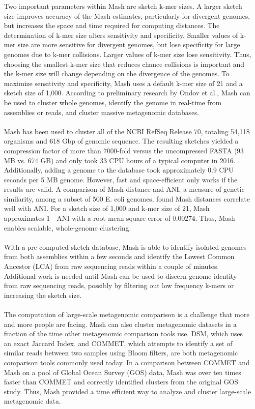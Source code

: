 \documentclass[12pt, letterpaper]{article}
\begin{document}
Two important parameters within Mash are sketch k-mer sizes. A larger sketch size improves accuracy of the Mash estimates, particularly for divergent genomes, but increases the space and time required for computing distances. The determination of k-mer size alters sensitivity and specificity. Smaller values of k-mer size are more sensitive for divergent genomes, but lose specificity for large genomes due to k-mer collisions. Larger values of k-mer size lose sensitivity. Thus, choosing the smallest k-mer size that reduces chance collisions is important and the k-mer size will change depending on the divergence of the genomes. To maximize sensitivity and specificity, Mash uses a default k-mer size of 21 and a sketch size of 1,000. According to preliminary research by Ondov et al., Mash can be used to cluster whole genomes, identify the genome in real-time  from assemblies or reads, and cluster massive metagenomic databases. \\ \\
Mash has been used to cluster all of the NCBI RefSeq Release 70, totaling 54,118 organisms and 618 Gbp of genomic sequence. The resulting sketches yielded a compression factor of more than 7000-fold versus the uncompressed FASTA (93 MB vs. 674 GB) and only took 33 CPU hours of a typical computer in 2016. Additionally, adding a genome to the database took approximately 0.9 CPU seconds per 5 MB genome. However, fast and space-efficient only works if the results are valid. A comparison of Mash distance and ANI, a  measure of genetic similarity, among a subset of 500 E. coli genomes, found Mash distances correlate well with ANI. For a sketch size of 1,000 and k-mer size of 21, Mash approximates 1 - ANI with a root-mean-square error of 0.00274. Thus, Mash enables scalable, whole-genome clustering. \\ \\
With a pre-computed sketch database, Mash is able to identify isolated genomes from both assemblies within a few seconds and identify the Lowest Common Ancestor (LCA) from raw sequencing reads within a couple of minutes. Additional work is needed until Mash can be used to discern genome identity from raw sequencing reads, possibly by filtering out low frequency k-mers or increasing the sketch size. \\ \\
The computation of large-scale metagenomic comparison is a challenge that more and more people are facing. Mash can also cluster metagenomic datasets in a fraction of the time other metagenomic comparison tools use. DSM, which uses an exact Jaccard Index, and COMMET, which attempts to identify a set of similar reads between two samples using Bloom filters, are both metagenomic comparison tools commonly used today. In a comparison between COMMET and Mash on a pool of Global Ocean Survey (GOS) data, Mash was over ten times faster than COMMET and correctly identified clusters from the original GOS study. Thus, Mash provided a time efficient way to analyze and cluster large-scale metagenomic data. \\ \\
\end{document}
